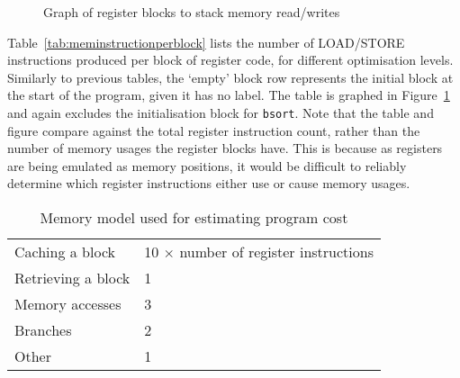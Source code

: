 \begin{figure}
  \caption{Graph of register blocks to stack memory read/writes}
\label{fig:meminstructionperblock}
\end{figure}

Table~\ref{tab:meminstructionperblock} lists the number of LOAD/STORE
instructions produced per block of register code, for different optimisation
levels. Similarly to previous tables, the `empty' block row represents the
initial block at the start of the program, given it has no label. The table is
graphed in Figure~\ref{fig:meminstructionperblock} and again excludes the
initialisation block for \texttt{bsort}. Note that the table and figure compare
against the total register instruction count, rather than the number of memory
usages the register blocks have. This is because as registers are being emulated
as memory positions, it would be difficult to reliably determine which register
instructions either use or cause memory usages.

\begin{table}
  \begin{tabular}{l l}
    Caching a block & 10 $\times$ number of register instructions \\
    Retrieving a block & 1 \\
    Memory accesses & 3 \\
    Branches & 2 \\
    Other & 1 \\
  \end{tabular}
  \caption{Memory model used for estimating program cost}\label{tab:memmodel}
\end{table}

